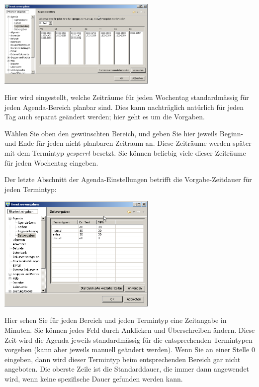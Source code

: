 \includegraphics[width=3in]{images/settings5.png}

Hier wird eingestellt, welche Zeiträume für jeden Wochentag standardmässig für jeden Agenda-Bereich planbar sind. Dies kann
nachträglich natürlich für jeden Tag auch separat geändert werden; hier geht es um die Vorgaben.

Wählen Sie oben den gewünschten Bereich, und geben Sie hier jeweils Beginn- und Ende für jeden nicht
planbaren Zeitraum an. Diese Zeiträume werden später mit dem Termintyp \textit{gesperrt} besetzt. Sie können beliebig viele dieser
Zeiträume für jeden Wochentag  eingeben.

Der letzte Abschnitt der Agenda-Einstellungen betrifft die Vorgabe-Zeitdauer für jeden Termintyp:

\includegraphics[width=3in]{images/settings6.png}

Hier sehen Sie für jeden Bereich und jeden Termintyp eine Zeitangabe in Minuten.
Sie können jedes Feld durch Anklicken und Überschreiben ändern. Diese Zeit wird die Agenda jeweils standardmässig für die entsprechenden
 Termintypen vorgeben (kann aber jeweils manuell geändert werden). Wenn Sie an einer Stelle 0 eingeben, dann wird dieser Termintyp beim
 entsprechenden Bereich gar nicht angeboten.
Die oberste Zeile ist die Standarddauer, die immer dann angewendet wird, wenn keine spezifische Dauer  gefunden werden kann.


